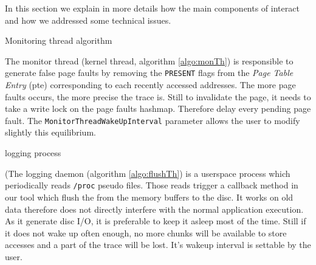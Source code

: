 In this section we explain in more details how the main components of \Moca
interact and how we addressed some technical issues.

\begin{algorithm}[htb]
    \caption{Monitoring thread algorithm}
    \label{algo:monTh}
    \begin{algorithmic}[1]
        \State {}
                    \State {}
                    \State {}
                    \State {}
                \EndFor
            \EndFor
            \State {}
        \EndWhile
    \end{algorithmic}
\end{algorithm}

The monitor thread (kernel thread, algorithm \ref{algo:monTh}) is
responsible to generate false page faults by removing the \texttt{PRESENT}
flags from the \emph{Page Table Entry} (pte) corresponding to each recently
accessed addresses. The more page faults occurs, the more
precise the trace is. Still to invalidate the page, it needs
to take a write lock on the page faults hashmap. Therefore
delay every pending page fault. The
\texttt{MonitorThreadWakeUpInterval} parameter allows the user
to modify slightly this equilibrium.

\begin{algorithm}[htb]
    \caption{logging process}
    \label{algo:flushTh}
    \begin{algorithmic}[1]
                \State {}
                \State {}
                \State {}
                \EndFor
            \EndFor
            \State {}
        \EndWhile
    \end{algorithmic}
\end{algorithm}

(The logging daemon (algorithm \ref{algo:flushTh}) is a userspace process
which periodically reads \texttt{/proc} pseudo files. Those reads trigger a
callback method in our tool which flush the  from the memory buffers to the
disc. It works on old data therefore does not directly interfere with the
normal application execution. As it generate disc I/O, it is preferable to
keep it asleep most of the time. Still if it does not wake up often enough, no
more chunks will be available to store accesses and a part of the trace will
be lost. It's wakeup interval is settable by the user.

